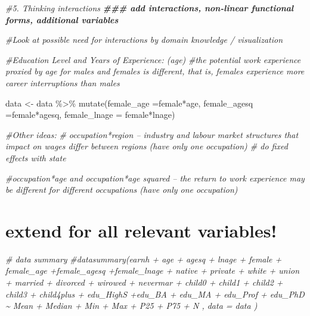 \documentclass[
]{article}
\newenvironment{Shaded}{\begin{snugshade}}{\end{snugshade}}
\newcommand{\AttributeTok}[1]{\textcolor[rgb]{0.77,0.63,0.00}{#1}}
\newcommand{\CommentTok}[1]{\textcolor[rgb]{0.56,0.35,0.01}{\textit{#1}}}
\newcommand{\DocumentationTok}[1]{\textcolor[rgb]{0.56,0.35,0.01}{\textbf{\textit{#1}}}}
\newcommand{\FunctionTok}[1]{\textcolor[rgb]{0.00,0.00,0.00}{#1}}
\newcommand{\NormalTok}[1]{#1}
\newcommand{\OtherTok}[1]{\textcolor[rgb]{0.56,0.35,0.01}{#1}}
\newcommand{\SpecialCharTok}[1]{\textcolor[rgb]{0.00,0.00,0.00}{#1}}
\begin{document}
\begin{Shaded}
\begin{Highlighting}[]
\CommentTok{\#5. Thinking interactions}
\DocumentationTok{\#\#\# add interactions, non{-}linear functional forms, additional variables }

\CommentTok{\#Look at possible need for interactions by domain knowledge / visualization}

\CommentTok{\#Education Level and Years of Experience: (age)}
\CommentTok{\#the potential work experience proxied by age for males and females is different, that is, females experience more career interruptions than males}

\NormalTok{data }\OtherTok{\textless{}{-}}\NormalTok{ data }\SpecialCharTok{\%\textgreater{}\%} \FunctionTok{mutate}\NormalTok{(}\AttributeTok{female\_age =}\NormalTok{female}\SpecialCharTok{*}\NormalTok{age,}
                        \AttributeTok{female\_agesq =}\NormalTok{female}\SpecialCharTok{*}\NormalTok{agesq,}
                        \AttributeTok{female\_lnage =}\NormalTok{ female}\SpecialCharTok{*}\NormalTok{lnage)}

\CommentTok{\#Other ideas:}
\CommentTok{\# occupation*region – industry and labour market structures that impact on wages differ between regions (have only one occupation) \# do fixed effects with state}

\CommentTok{\#occupation*age and occupation*age squared – the return to work experience may be different for different  occupations (have only one occupation)}
\end{Highlighting}
\end{Shaded}

\hypertarget{extend-for-all-relevant-variables}{%
\section{extend for all relevant
variables!}\label{extend-for-all-relevant-variables}}

\begin{Shaded}
\begin{Highlighting}[]
\CommentTok{\# data summary}
\CommentTok{\#datasummary(earnh + age + agesq + lnage + female + female\_age +female\_agesq +female\_lnage + native + private + white + union + married + divorced + wirowed + nevermar + child0 + child1 + child2 + child3 + child4plus  + edu\_HighS +edu\_BA + edu\_MA + edu\_Prof + edu\_PhD    \textasciitilde{} Mean + Median + Min + Max + P25 + P75 + N , data = data )}
\end{Highlighting}
\end{Shaded}
\end{document}
